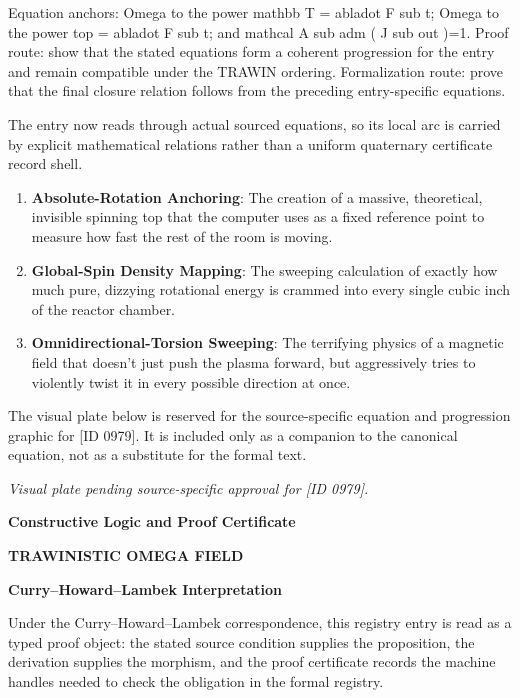 Equation anchors: Omega to the power mathbb T = abladot F sub t; Omega to the power top = abladot F sub t; and mathcal A sub adm ( J sub out )=1. Proof route: show that the stated equations form a coherent progression for the entry and remain compatible under the TRAWIN ordering. Formalization route: prove that the final closure relation follows from the preceding entry-specific equations.

The entry now reads through actual sourced equations, so its local arc is carried by explicit mathematical relations rather than a uniform quaternary certificate record shell.
\endgroup

\begin{enumerate}[leftmargin=1.6em,itemsep=6pt,topsep=4pt]
\item \textbf{Absolute-Rotation Anchoring}: The creation of a massive, theoretical, invisible spinning top that the computer uses as a fixed reference point to measure how fast the rest of the room is moving.
\item \textbf{Global-Spin Density Mapping}: The sweeping calculation of exactly how much pure, dizzying rotational energy is crammed into every single cubic inch of the reactor chamber.
\item \textbf{Omnidirectional-Torsion Sweeping}: The terrifying physics of a magnetic field that doesn't just push the plasma forward, but aggressively tries to violently twist it in every possible direction at once.
\end{enumerate}

\begingroup\footnotesize\sloppy
The visual plate below is reserved for the source-specific equation and progression graphic for [ID 0979]. It is included only as a companion to the canonical equation, not as a substitute for the formal text.
\par\endgroup
\begingroup\footnotesize\itshape
Visual plate pending source-specific approval for [ID 0979].
\par\endgroup

\clearpage
\begingroup\tzpsupportsetup
\noindent\textbf{\fontsize{10.8pt}{12.8pt}\selectfont [ID 0979] Constructive Logic and Proof Certificate}\par
\noindent\textbf{\fontsize{10pt}{12pt}\selectfont TRAWINISTIC OMEGA FIELD}\par
\vspace{0.45em}
\begingroup
\footnotesize
\setlength{\parskip}{0.22em}
\setlength{\parindent}{0pt}
\noindent\textbf{Curry--Howard--Lambek Interpretation}\par
Under the Curry--Howard--Lambek correspondence, this registry entry is read as a typed proof
object: the stated source condition supplies the proposition, the derivation supplies the
morphism, and the proof certificate records the machine handles needed to check the obligation
in the formal registry.


